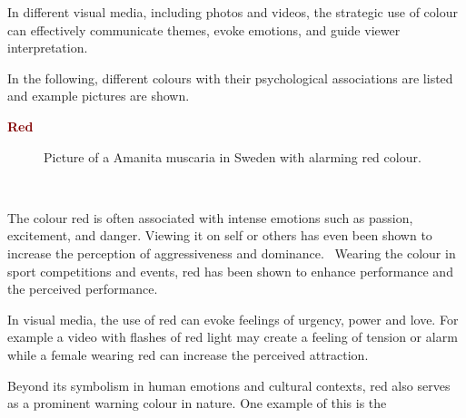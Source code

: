 \documentclass[../MasterThesis.tex]{subfiles}
\begin{document}
In different visual media, including photos and videos, the strategic use of colour can effectively communicate themes, evoke emotions, and guide viewer interpretation.~\cite{cc_cg_1, cc_cg_2, colour, colour2}


In the following, different colours with their psychological associations are listed and example pictures are shown.



\textbf{\textcolor{Maroon}{Red}}

%
%

\begin{minipage}{0.5\textwidth}
	\begin{figure}[H]
		\begin{center}
			\caption[Picture of a Amanita muscaria in Sweden with alarming red colour.]{Picture of a Amanita muscaria in Sweden with alarming red colour.}
			\label{figure:red}
		\end{center}
	\end{figure}
 \hfill
\end{minipage}\begin{minipage}{0.05\textwidth}
	\ 
\end{minipage}\begin{minipage}{0.45\textwidth}
	The colour red is often associated with intense emotions such as passion, excitement, and danger. Viewing it on self or others has even been shown to increase the perception of aggressiveness and dominance.~\cite{red_dominance} Wearing the colour in sport competitions and events, red has been shown to enhance performance and the perceived performance.~\cite{colour, red_sport}
	
	In visual media, the use of red can evoke feelings of urgency, power and love. For example a video with flashes of red light may create a feeling of tension or alarm while a female wearing red can increase the perceived attraction.~\cite{colour, red_romance}
	
	Beyond its symbolism in human emotions and cultural contexts, red also serves as a prominent warning colour in nature. One example of this is the
	
\end{minipage}
\end{document}
